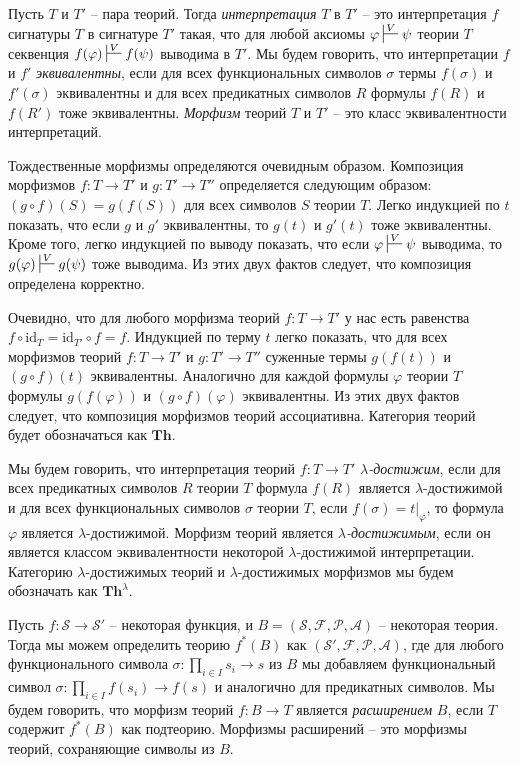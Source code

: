 \documentclass[reqno]{amsart}
\theoremstyle{definition}
\theoremstyle{remark}
\newcommand{\bcat}[1]{\mathbf{#1}}
\newcommand{\fs}[1]{\mathrm{#1}}
\newcommand{\Th}{\bcat{Th}}
\begin{document}
Пусть $T$ и $T'$ -- пара теорий.
Тогда \emph{интерпретация} $T$ в $T'$ -- это интерпретация $f$ сигнатуры $T$ в сигнатуре $T'$ такая,
что для любой аксиомы $\varphi \sststile{}{V} \psi$ теории $T$ секвенция $f(\varphi) \sststile{}{V} f(\psi)$ выводима в $T'$.
Мы будем говорить, что интерпретации $f$ и $f'$ \emph{эквивалентны}, если для всех функциональных символов $\sigma$ термы $f(\sigma)$ и $f'(\sigma)$ эквивалентны и для всех предикатных символов $R$ формулы $f(R)$ и $f(R')$ тоже эквивалентны.
\emph{Морфизм} теорий $T$ и $T'$ -- это класс эквивалентности интерпретаций.

Тождественные морфизмы определяются очевидным образом.
Композиция морфизмов $f : T \to T'$ и $g : T' \to T''$ определяется следующим образом: $(g \circ f)(S) = g(f(S))$ для всех символов $S$ теории $T$.
Легко индукцией по $t$ показать, что если $g$ и $g'$ эквивалентны, то $g(t)$ и $g'(t)$ тоже эквивалентны.
Кроме того, легко индукцией по выводу показать, что если $\varphi \sststile{}{V} \psi$ выводима, то $g(\varphi) \sststile{}{V} g(\psi)$ тоже выводима.
Из этих двух фактов следует, что композиция определена корректно.

Очевидно, что для любого морфизма теорий $f : T \to T'$ у нас есть равенства $f \circ \fs{id}_T = \fs{id}_{T'} \circ f = f$.
Индукцией по терму $t$ легко показать, что для всех морфизмов теорий $f : T \to T'$ и $g : T' \to T''$ суженные термы $g(f(t))$ и $(g \circ f)(t)$ эквивалентны.
Аналогично для каждой формулы $\varphi$ теории $T$ формулы $g(f(\varphi))$ и $(g \circ f)(\varphi)$ эквивалентны.
Из этих двух фактов следует, что композиция морфизмов теорий ассоциативна.
Категория теорий будет обозначаться как $\Th$.

Мы будем говорить, что интерпретация теорий $f : T \to T'$ \emph{$\lambda$-достижим}, если для всех предикатных символов $R$ теории $T$ формула $f(R)$ является $\lambda$-достижимой
и для всех функциональных символов $\sigma$ теории $T$, если $f(\sigma) = t|_\varphi$, то формула $\varphi$ является $\lambda$-достижимой.
Морфизм теорий является \emph{$\lambda$-достижимым}, если он является классом эквивалентности некоторой $\lambda$-достижимой интерпретации.
Категорию $\lambda$-достижимых теорий и $\lambda$-достижимых морфизмов мы будем обозначать как $\Th^\lambda$.

Пусть $f : \mathcal{S} \to \mathcal{S}'$ -- некоторая функция, и $B = (\mathcal{S},\mathcal{F},\mathcal{P},\mathcal{A})$ -- некоторая теория.
Тогда мы можем определить теорию $f^*(B)$ как $(\mathcal{S}',\mathcal{F},\mathcal{P},\mathcal{A})$,
где для любого функционального символа $\sigma : \prod_{i \in I} s_i \to s$ из $B$ мы добавляем функциональный символ $\sigma : \prod_{i \in I} f(s_i) \to f(s)$ и аналогично для предикатных символов.
Мы будем говорить, что морфизм теорий $f : B \to T$ является \emph{расширением} $B$, если $T$ содержит $f^*(B)$ как подтеорию.
Морфизмы расширений -- это морфизмы теорий, сохраняющие символы из $B$.
\end{document}
